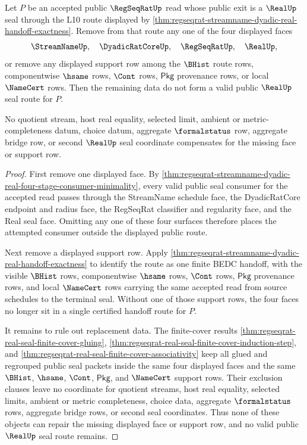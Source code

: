 \begin{theorem}
\label{thm:regseqrat-real-seal-support-removal-obstruction}
Let $P$ be an accepted public $\RegSeqRatUp$ read whose public exit is a
$\RealUp$ seal through the L10 route displayed by
\autoref{thm:regseqrat-streamname-dyadic-real-handoff-exactness}. Remove from
that route any one of the four displayed faces
$$
\StreamNameUp,\quad \DyadicRatCoreUp,\quad \RegSeqRatUp,\quad \RealUp,
$$
or remove any displayed support row among the $\BHist$ route rows,
componentwise $\hsame$ rows, $\Cont$ rows, $\mathsf{Pkg}$ provenance rows, or
local $\NameCert$ rows. Then the remaining data do not form a valid public
$\RealUp$ seal route for $P$.

No quotient stream, host real equality, selected limit, ambient or
metric-completeness datum, choice datum, aggregate $\formalstatus$ row,
aggregate bridge row, or second $\RealUp$ seal coordinate compensates for the
missing face or support row.
\end{theorem}
\begin{proof}
First remove one displayed face. By
\autoref{thm:regseqrat-streamname-dyadic-real-four-stage-consumer-minimality},
every valid public seal consumer for the accepted read passes through the
StreamName schedule face, the DyadicRatCore endpoint and radius face, the
RegSeqRat classifier and regularity face, and the Real seal face. Omitting any
one of these four surfaces therefore places the attempted consumer outside the
displayed public route.

Next remove a displayed support row. Apply
\autoref{thm:regseqrat-streamname-dyadic-real-handoff-exactness} to identify
the route as one finite BEDC handoff, with the visible $\BHist$ rows,
componentwise $\hsame$ rows, $\Cont$ rows, $\mathsf{Pkg}$ provenance rows, and
local $\NameCert$ rows carrying the same accepted read from source schedules to
the terminal seal. Without one of those support rows, the four faces no longer
sit in a single certified handoff route for $P$.

It remains to rule out replacement data. The finite-cover results
\autoref{thm:regseqrat-real-seal-finite-cover-gluing},
\autoref{thm:regseqrat-real-seal-finite-cover-induction-step}, and
\autoref{thm:regseqrat-real-seal-finite-cover-associativity} keep all glued
and regrouped public seal packets inside the same four displayed faces and
the same $\BHist$, $\hsame$, $\Cont$, $\mathsf{Pkg}$, and $\NameCert$ support
rows. Their exclusion clauses leave no coordinate for quotient streams, host
real equality, selected limits, ambient or metric completeness, choice data,
aggregate $\formalstatus$ rows, aggregate bridge rows, or second seal
coordinates. Thus none of these objects can repair the missing displayed face
or support row, and no valid public $\RealUp$ seal route remains.
\end{proof}
